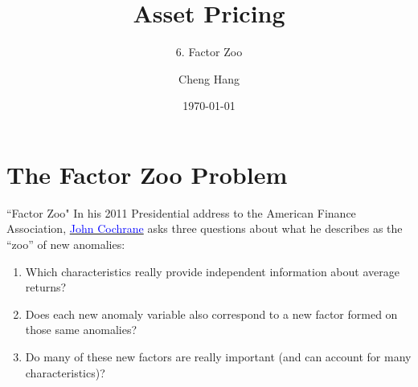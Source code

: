 \documentclass{beamer}
\title[Asset Pricing]{\textbf{Asset Pricing}} %
\subtitle{6. Factor Zoo}
\author[Cheng Hang]{Cheng Hang} %
\institute[DUFE] %
{School of Fintech \\
Dongbei University of Finance \& Economics \\ %
\medskip
\textbf{chenghangch@qq.com}%
}
\date{\today} %
\begin{document}
\begin{frame}
\titlepage %
\end{frame}



\section{The Factor Zoo Problem}

\begin{frame}{``Factor Zoo"}
	In his 2011 Presidential address to the American Finance Association, \href{https://onlinelibrary.wiley.com/doi/10.1111/j.1540-6261.2011.01671.x}{\textcolor{blue}{John Cochrane}}  asks three questions about what he describes as the “zoo” of new anomalies:
	\begin{enumerate}
		\item Which characteristics really provide independent information about average returns?
		\item Does each new anomaly variable also correspond to a new factor formed on those same anomalies?
		\item Do many of these new factors are really important (and can account for many
		characteristics)?
	\end{enumerate}
\end{frame}
\end{document}
